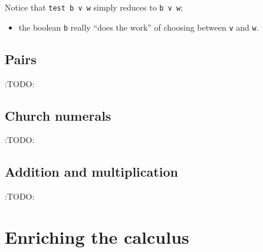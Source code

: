 \documentclass[11pt]{article}
\theoremstyle{definition}
\begin{document}
Notice that \texttt{test b v w} simply reduces to \texttt{b v w};
\begin{itemize}
\item the boolean \texttt{b} really “does the work”
of choosing between \texttt{v} and \texttt{w}.
\end{itemize}

\subsection{Pairs}
\label{sec:org6a31c37}

:TODO:

\subsection{Church numerals}
\label{sec:org07fd557}

:TODO:

\subsection{Addition and multiplication}
\label{sec:org84be5db}

:TODO:

\section{Enriching the calculus}
\label{sec:org365888d}

\section{}
\label{sec:org849d607}
\end{document}

